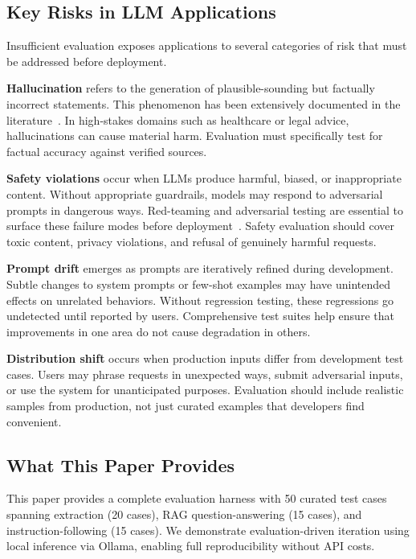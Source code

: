 \subsection{Key Risks in LLM Applications}

Insufficient evaluation exposes applications to several categories of risk that must be addressed before deployment.

\textbf{Hallucination} refers to the generation of plausible-sounding but factually incorrect statements. This phenomenon has been extensively documented in the literature~\citep{ji2023hallucination, lin2022truthfulqa}. In high-stakes domains such as healthcare or legal advice, hallucinations can cause material harm. Evaluation must specifically test for factual accuracy against verified sources.

\textbf{Safety violations} occur when LLMs produce harmful, biased, or inappropriate content. Without appropriate guardrails, models may respond to adversarial prompts in dangerous ways. Red-teaming and adversarial testing are essential to surface these failure modes before deployment~\citep{perez2022red, ganguli2022red}. Safety evaluation should cover toxic content, privacy violations, and refusal of genuinely harmful requests.

\textbf{Prompt drift} emerges as prompts are iteratively refined during development. Subtle changes to system prompts or few-shot examples may have unintended effects on unrelated behaviors. Without regression testing, these regressions go undetected until reported by users. Comprehensive test suites help ensure that improvements in one area do not cause degradation in others.

\textbf{Distribution shift} occurs when production inputs differ from development test cases. Users may phrase requests in unexpected ways, submit adversarial inputs, or use the system for unanticipated purposes. Evaluation should include realistic samples from production, not just curated examples that developers find convenient.

\subsection{What This Paper Provides}

This paper provides a complete evaluation harness with 50 curated test cases spanning extraction (20 cases), RAG question-answering (15 cases), and instruction-following (15 cases). We demonstrate evaluation-driven iteration using local inference via Ollama, enabling full reproducibility without API costs.

